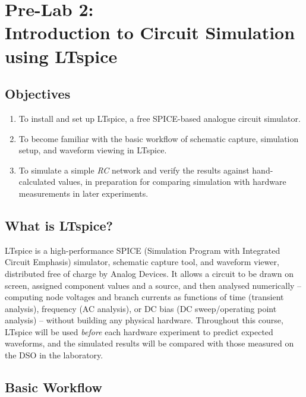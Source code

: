 %

\chapter*{Pre-Lab 2:\\Introduction to Circuit Simulation using LTspice}
\label{chap:prelab2}
\section*{Objectives}
\begin{enumerate}[label=(\roman*)]
	\item To install and set up LTspice, a free SPICE-based analogue circuit simulator.
	\item To become familiar with the basic workflow of schematic capture, simulation setup, and waveform viewing in LTspice.
	\item To simulate a simple \emph{RC} network and verify the results against hand-calculated values, in preparation for comparing simulation with hardware measurements in later experiments.
\end{enumerate}

\section*{What is LTspice?}

LTspice is a high-performance SPICE (Simulation Program with Integrated Circuit Emphasis) simulator, schematic capture tool, and waveform viewer, distributed free of charge by Analog Devices. It allows a circuit to be drawn on screen, assigned component values and a source, and then analysed numerically -- computing node voltages and branch currents as functions of time (transient analysis), frequency (AC analysis), or DC bias (DC sweep/operating point analysis) -- without building any physical hardware. Throughout this course, LTspice will be used \emph{before} each hardware experiment to predict expected waveforms, and the simulated results will be compared with those measured on the DSO in the laboratory.

\section*{Basic Workflow}

